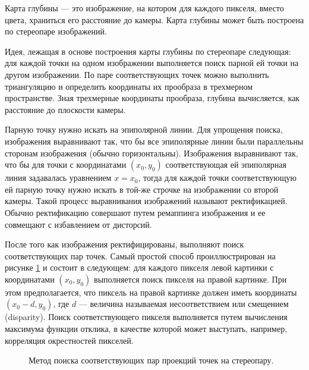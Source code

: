 Карта глубины — это изображение, на котором для каждого пикселя, вместо цвета, храниться его расстояние до камеры. Карта глубины может быть построена по стереопаре изображений.

Идея, лежащая в основе построения карты глубины по стереопаре следующая: для каждой точки на одном изображении выполняется поиск парной ей точки на другом изображении. По паре соответствующих точек можно выполнить триангуляцию и определить координаты их прообраза в трехмерном пространстве. Зная трехмерные координаты прообраза, глубина вычисляется, как расстояние до плоскости камеры.

Парную точку нужно искать на эпиполярной линии. Для упрощения поиска, изображения выравнивают так, что бы все эпиполярные линии были параллельны сторонам изображения (обычно горизонтальны). Изображения выравнивают так, что бы для точки с координатами $(x_0, y_0)$ соответствующая ей эпиполярная линия задавалась уравнением $x = x_0$, тогда для каждой точки соответствующую ей парную точку нужно искать в той-же строчке на изображении со второй камеры. Такой процесс выравнивания изображений называют ректификацией. Обычно ректификацию совершают путем ремаппинга изображения и ее совмещают с избавлением от дисторсий.

После того как изображения ректифицированы, выполняют поиск соответствующих пар точек. Самый простой способ проиллюстрирован на рисунке \ref{img:approach} и состоит в следующем: для каждого пикселя левой картинки с координатами $(x_0, y_0)$ выполняется поиск пикселя на правой картинке. При этом предполагается, что пиксель на правой картинке должен иметь координаты $(x_0 - d, y_0)$, где $d$ — величина называемая несоответствием или смещением (disparity). Поиск соответствующего пикселя выполняется путем вычисления максимума функции отклика, в качестве которой может выступать, например, корреляция окрестностей пикселей.

\begin{figure}[!h]
	\caption{Метод поиска соответствующих пар проекций точек на стереопару.}
	\label{img:approach}
\end{figure}